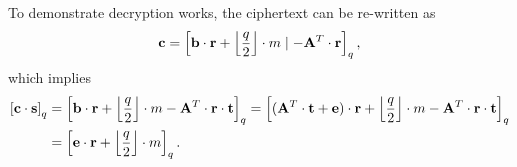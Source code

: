 \documentclass[../main.tex]{subfiles}
\begin{document}
To demonstrate decryption works, the ciphertext can be re-written as 
\begin{align*}
    \mathbf{c}=\left[{\mathbf{b} \cdot \mathbf{r} + \left\lfloor{\frac{q}{2}}\right\rfloor \cdot m \mid -\mathbf{A}^T \cdot \mathbf{r}}\right]_q,
\end{align*}
which implies 
\begin{align*}
    \left[{\mathbf{c} \cdot \mathbf{s}}\right]_q
    &= \left[{\mathbf{b} \cdot \mathbf{r} + \left\lfloor{\frac{q}{2}}\right\rfloor \cdot m - \mathbf{A}^T \cdot \mathbf{r} \cdot \mathbf{t}}\right]_q
    = \left[{(\mathbf{A}^T \cdot \mathbf{t} + \mathbf{e}) \cdot \mathbf{r} + \left\lfloor{\frac{q}{2}}\right\rfloor \cdot m - \mathbf{A}^T \cdot \mathbf{r} \cdot \mathbf{t}}\right]_q\\
    &=\left[{\mathbf{e} \cdot \mathbf{r} + \left\lfloor{\frac{q}{2}}\right\rfloor \cdot m}\right]_q.
\end{align*}
\end{document}
